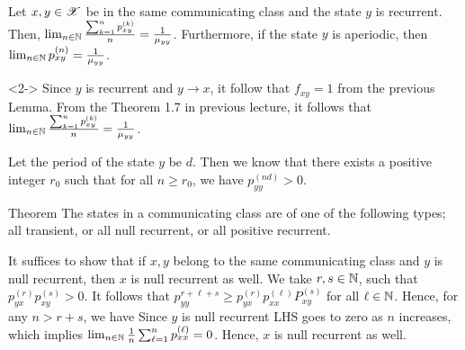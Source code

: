\documentclass[12pt,aspectratio=169]{beamer}
\begin{document}
\begin{frame}
\begin{cor} 
Let $x, y \in \mathscr{X}$ be in the same communicating class and the state $y$ is recurrent.  
Then, $\lim_{n \in \mathbb{N}}\frac{\sum_{k=1}^np_{xy}^{(k)}}{n} = \frac{1}{\mu_{yy}}$. 
Furthermore, if the state $y$ is aperiodic, then $\lim_{n \in \mathbb{N}}p_{xy}^{(n)} = \frac{1}{\mu_{yy}}$. 
\end{cor}
\begin{Proof}<2->
Since $y$ is recurrent and $y \to x$, it follow that $f_{xy} = 1$ from the previous Lemma. 
From the Theorem 1.7 in previous lecture, it follows that $\lim_{n \in \mathbb{N}}\frac{\sum_{k=1}^np_{xy}^{(k)}}{n} = \frac{1}{\mu_{yy}}$. 

Let the period of the state $y$ be $d$. 
Then we know that there exists a positive integer $r_0$ such that for all $n \ge r_0$, we have $p_{yy}^{(nd)} > 0$. 
\end{Proof}
\end{frame}
\begin{frame}
\begin{block}{Theorem} 
The states in a communicating class are of one of the following types; all transient, or all null recurrent, or all positive recurrent. 
\end{block}
\end{frame}
\begin{frame}
\begin{Proof} 
It suffices to show that if $x,y$ belong to the same communicating class and $y$ is null recurrent, then $x$ is null recurrent as well. 
We take $r,s \in \mathbb{N}$, such that $p_{yx}^{(r)}p_{xy}^{(s)} > 0$. 
It follows that $p_{yy}^{r+\ell+s} \ge p_{yx}^{(r)}p_{xx}^{(\ell)}P_{xy}^{(s)}$ for all $\ell \in \mathbb{N}$. 
Hence, for any $n > r + s$, we have 
Since $y$ is null recurrent LHS goes to zero as $n$ increases, which implies $\lim_{n \in \mathbb{N}}\frac{1}{n}\sum_{\ell = 1}^{n}p_{xx}^{(\ell)} = 0$. 
Hence, $x$ is null recurrent as well. 
\end{Proof}
\end{frame}
\end{document}
